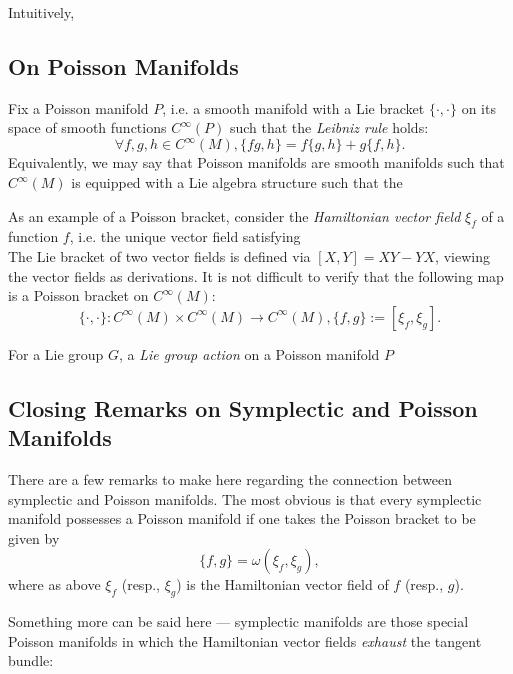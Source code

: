 Intuitively, %

\subsection{On Poisson Manifolds}
Fix a Poisson manifold $P$, i.e. a smooth manifold with a Lie bracket $\{\cdot,\cdot\}$ on its space of smooth functions $C^\infty(P)$ such that the \emph{Leibniz rule} holds:
$$
\forall f,g,h \in C^\infty(M), \{fg,h\} = f\{g,h\} + g\{f,h\}.
$$
Equivalently, we may say that Poisson manifolds are smooth manifolds such that $C^\infty(M)$ is equipped with a Lie algebra structure such that the %

\begin{example}
As an example of a Poisson bracket, consider the \emph{Hamiltonian vector field} $\xi_f$ of a function $f$, i.e. the unique vector field satisfying
$$
$$
The Lie bracket of two vector fields is defined via $[X,Y] = XY - YX$, viewing the vector fields as derivations. It is not difficult to verify that the following map is a Poisson bracket on $C^\infty(M)$:
$$
\{\cdot, \cdot\}: C^\infty(M) \times C^\infty(M) \to C^\infty(M), \{f,g\} := [\xi_f,\xi_g].
$$
\end{example}

For a Lie group $G$, a \emph{Lie group action} on a Poisson manifold $P$ 

\subsection{Closing Remarks on Symplectic and Poisson Manifolds}
There are a few remarks to make here regarding the connection between symplectic and Poisson manifolds. The most obvious is that every symplectic manifold possesses a Poisson manifold if one takes the Poisson bracket to be given by
$$
\{f,g\} = \omega(\xi_f,\xi_g),
$$
where as above $\xi_f$ (resp., $\xi_g$) is the Hamiltonian vector field of $f$ (resp., $g$).

Something more can be said here --- symplectic manifolds are those special Poisson manifolds in which the Hamiltonian vector fields \emph{exhaust} the tangent bundle:
\begin{thrm}
\end{thrm}

